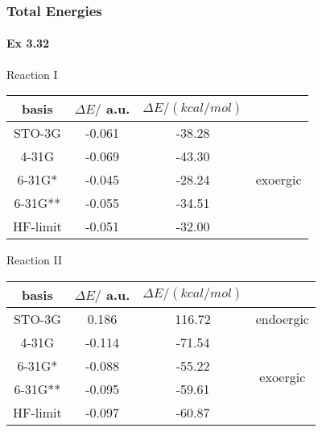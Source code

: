 \documentclass[a4paper]{article}
\newcommand{\ex}[1]{\paragraph{Ex #1}}
\numberwithin{equation}{subsection}
\begin{document}
\subsubsection{Total Energies}
\ex{3.32}
Reaction I
\begin{table}[H]
	\begin{tabular}{ccc|c}
		\hline
		basis & $ \Delta E /  $ a.u.& $ \Delta E /(\si{kcal/mol}) $& \\
		\hline
		STO-3G   & -0.061 & -38.28 &\\
		4-31G    & -0.069 & -43.30 &\\
		6-31G*   & -0.045 & -28.24 & exoergic\\ 
		6-31G**  & -0.055 &	-34.51 & \\
		HF-limit & -0.051 & -32.00 &\\
		\hline		
	\end{tabular}
\end{table}
Reaction II
\begin{table}[H]
	\begin{tabular}{ccc|c}
		\hline
		basis & $ \Delta E /  $ a.u.& $ \Delta E /(\si{kcal/mol}) $ &\\
		\hline
		STO-3G   &  0.186 &	116.72 & endoergic	\\ \cline{4-4}
		4-31G    & -0.114 &	-71.54 & \multirow{4}{*}{exoergic}\\
		6-31G*   & -0.088 &	-55.22 &\\
		6-31G**  & -0.095 &	-59.61 &\\
		HF-limit & -0.097 &	-60.87 &\\
		\hline		
	\end{tabular}
\end{table}
\end{document}

